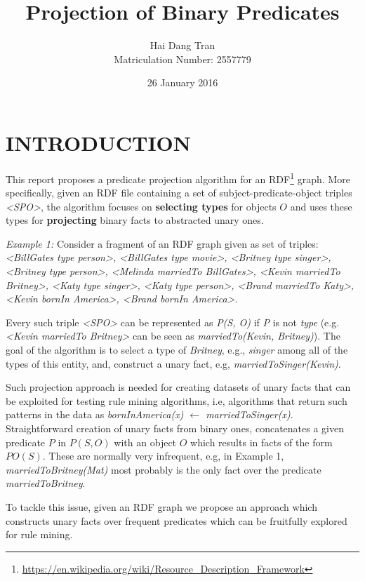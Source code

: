 \documentclass{acm_proc_article-sp}
\begin{document}
\title{Projection of Binary Predicates}
\author{
\alignauthor
Hai Dang Tran\\Matriculation Number: 2557779
}
\date{26 January 2016}

\maketitle

\section{INTRODUCTION}
This report proposes a predicate projection algorithm for an RDF\footnote{\url{https://en.wikipedia.org/wiki/Resource_Description_Framework}} graph. More specifically, given an RDF file containing a set of subject-predicate-object triples \textit{<SPO>}, the algorithm focuses on \textbf{selecting types} for objects $O$ and uses these types for \textbf{projecting} binary facts to abstracted unary ones.

\textit{Example 1:} Consider a fragment of an RDF graph given as set of triples: \textit{<BillGates type person>, <BillGates type movie>, <Britney type singer>, <Britney type person>, <Melinda marriedTo BillGates>, <Kevin marriedTo Britney>, <Katy type singer>, <Katy type person>, <Brand marriedTo Katy>, <Kevin bornIn America>, <Brand bornIn America>}.

Every such triple \textit{<SPO>} can be represented as \textit{P(S, O)} if \textit{P} is not \textit{type} (e.g. \textit{<Kevin marriedTo Britney>} can be seen as \textit{marriedTo(Kevin, Britney)}). The goal of the algorithm is to select a type of \textit{Britney}, e.g., \textit{singer} among all of the types of this entity, and, construct a unary fact, e.g, \textit{marriedToSinger(Kevin)}.

Such projection approach is needed for creating datasets of unary facts that can be exploited for testing rule mining algorithms, i.e, algorithms that return such patterns in the data as \textit{bornInAmerica(x) $\leftarrow$ marriedToSinger(x)}. Straightforward creation of unary facts from binary ones, concatenates a given predicate $P$ in $P(S, O)$ with an object $O$ which results in facts of the form $PO(S)$. These are normally very infrequent, e.g, in Example 1, \textit{marriedToBritney(Mat)} most probably is the only fact over the predicate \textit{marriedToBritney}.

To tackle this issue, given an RDF graph we propose an approach which constructs unary facts over frequent predicates which can be fruitfully explored for rule mining.
\end{document}

